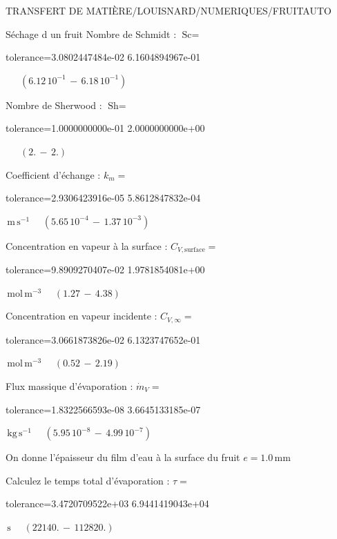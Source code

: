 \documentclass[12pt]{article}
\begin{document}
\begin{quiz}{TRANSFERT DE MATIÈRE/LOUISNARD/NUMERIQUES/FRUITAUTO}
\begin{cloze}{Séchage d un fruit}
Nombre de Schmidt : $\text{Sc} =  $
\begin{numerical}[points=1] 
\item[tolerance={3.0802447484e-02}] 6.1604894967e-01 
\end{numerical} 
 $\,$ 
 $ \quad ( 6.12 \, 10^{-1}  \, - \,  6.18 \, 10^{-1} ) $ 

Nombre de Sherwood : $\text{Sh} =  $
\begin{numerical}[points=2] 
\item[tolerance={1.0000000000e-01}] 2.0000000000e+00 
\end{numerical} 
 $\,$ 
 $ \quad (2. \, - \, 2.) $ 

Coefficient d'échange : $k_m =  $
\begin{numerical}[points=1] 
\item[tolerance={2.9306423916e-05}] 5.8612847832e-04 
\end{numerical} 
 $\,  \mathrm{m}\,  \mathrm{s}^{-1}$ 
 $ \quad ( 5.65 \, 10^{-4}  \, - \,  1.37 \, 10^{-3} ) $ 

Concentration en vapeur à la surface : $C_{V, \text{surface}} =  $
\begin{numerical}[points=2] 
\item[tolerance={9.8909270407e-02}] 1.9781854081e+00 
\end{numerical} 
 $\,  \mathrm{mol}\,  \mathrm{m}^{-3}$ 
 $ \quad (1.27 \, - \, 4.38) $ 

Concentration en vapeur incidente : $C_{V, \infty} =  $
\begin{numerical}[points=2] 
\item[tolerance={3.0661873826e-02}] 6.1323747652e-01 
\end{numerical} 
 $\,  \mathrm{mol}\,  \mathrm{m}^{-3}$ 
 $ \quad (0.52 \, - \, 2.19) $ 

Flux massique d'évaporation : $\dot{m}_V =  $
\begin{numerical}[points=1] 
\item[tolerance={1.8322566593e-08}] 3.6645133185e-07 
\end{numerical} 
 $\,  \mathrm{kg}\,  \mathrm{s}^{-1}$ 
 $ \quad ( 5.95 \, 10^{-8}  \, - \,  4.99 \, 10^{-7} ) $ 

 

On donne l'épaisseur du film d'eau à la surface du fruit $e = 1.0\,  \mathrm{mm} $

Calculez le temps total d'évaporation : $\tau =  $
\begin{numerical}[points=2] 
\item[tolerance={3.4720709522e+03}] 6.9441419043e+04 
\end{numerical} 
 $\,  \mathrm{s}$ 
 $ \quad (22140. \, - \, 112820.) $ 


\end{cloze}
\end{quiz}
\end{document}
